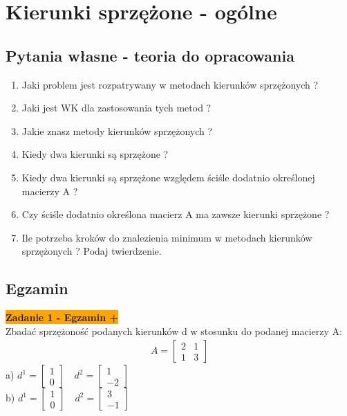 \documentclass[a4paper,11pt]{article}
\begin{document}
\newpage
\section{Kierunki sprzężone - ogólne }

\subsection{Pytania własne - teoria do opracowania}

\begin{enumerate}
\item Jaki problem jest rozpatrywany w metodach kierunków sprzężonych ?
\item Jaki jest WK dla zastosowania tych metod ?
\item Jakie znasz metody kierunków sprzężonych ?
\item Kiedy dwa kierunki są sprzężone ?
\item Kiedy dwa kierunki są sprzężone względem ściśle dodatnio określonej macierzy A ?
\item Czy ściśle dodatnio określona macierz A ma zawsze kierunki sprzężone ?
\item Ile potrzeba kroków do znalezienia minimum w metodach kierunków sprzężonych ? Podaj twierdzenie.
\end{enumerate}


\subsection{Egzamin}

\begin{framed}
\textbf{\colorbox{orange}{Zadanie 1 - Egzamin +}} \\
Zbadać sprzężoność podanych kierunków d w stosunku do podanej macierzy A:
\begin{align*}
A = 
\begin{bmatrix}
2 & 1 \\
1 & 3 
\end{bmatrix}
\end{align*}
a) \( d^1 = \begin{bmatrix}
1 \\ 0 
\end{bmatrix} \quad d^2 = \begin{bmatrix}
1 \\ -2
\end{bmatrix} \) \\
b)  \( d^1 = \begin{bmatrix}
1 \\ 0 
\end{bmatrix} \quad d^2 = \begin{bmatrix}
3 \\ -1
\end{bmatrix} \)

\end{framed}
\end{document}
